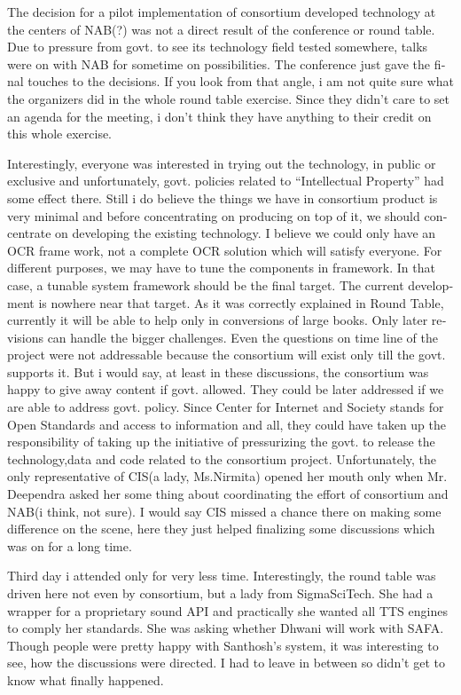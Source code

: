 \begin{english}
The decision for a pilot implementation of consortium developed technology at the centers of NAB(?) was not a direct result of the conference or round table. Due to pressure from govt. to see its technology field tested somewhere, talks were on with NAB for sometime on possibilities. The conference just gave the final touches to the decisions. If you look from that angle, i am not quite sure what the organizers did in the whole round table exercise. Since they didn’t care to set an agenda for the meeting, i don’t think they have anything to their credit on this whole exercise.

Interestingly, everyone was interested in trying out the technology, in public or exclusive and unfortunately, govt. policies related to “Intellectual Property” had some effect there. Still i do believe the things we have in consortium product is very minimal and before concentrating on producing on top of it, we should concentrate on developing the existing technology. I believe we could only have an OCR frame work, not a complete OCR solution which will satisfy everyone. For different purposes, we may have to tune the components in framework. In that case, a tunable system framework should be the final target. The current development is nowhere near that target. As it was correctly explained in Round Table, currently it will be able to help only in conversions of large books. Only later revisions can handle the bigger challenges. Even the questions on time line of the project were not addressable because the consortium will exist only till the govt. supports it. But i would say, at least in these discussions, the consortium was happy to give away content if govt. allowed. They could be later addressed if we are able to address govt. policy. Since Center for Internet and Society stands for Open Standards and access to information and all, they could have taken up the responsibility of taking up the initiative of pressurizing the govt. to release the technology,data and code related to the consortium project. Unfortunately, the only representative of CIS(a lady, Ms.Nirmita) opened her mouth only when Mr. Deependra asked her some thing about coordinating the effort of consortium and NAB(i think, not sure). I would say CIS missed a chance there on making some difference on the scene, here they just helped finalizing some discussions which was on for a long time.

Third day i attended only for very less time. Interestingly, the round table was driven here not even by consortium, but a lady from SigmaSciTech. She had a wrapper for a proprietary sound API and practically she wanted all TTS engines to comply her standards. She was asking whether Dhwani will work with SAFA. Though people were pretty happy with Santhosh’s system, it was interesting to see, how the discussions were directed. I had to leave in between so didn’t get to know what finally happened.


\end{english}
